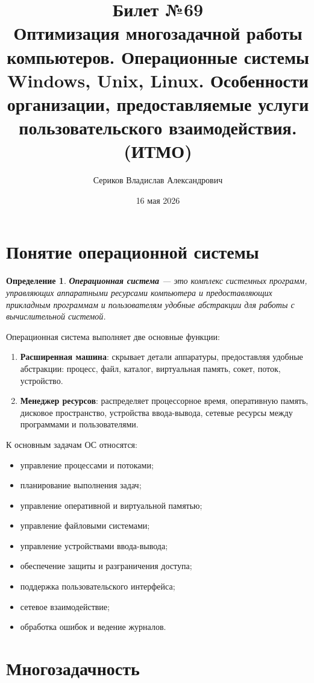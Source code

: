 \documentclass[12pt,a4paper]{article}
\title{Билет №69 \\ \small Оптимизация многозадачной работы компьютеров. Операционные системы Windows, Unix, Linux. Особенности организации, предоставляемые услуги пользовательского взаимодействия. (ИТМО)}
\author{Сериков Владислав Александрович}
\date{16 мая 2026}
\newtheorem{definition}{Определение}
\begin{document}
\maketitle
\tableofcontents
\newpage

\section{Понятие операционной системы}

\begin{definition}
\textbf{Операционная система} --- это комплекс системных программ, управляющих аппаратными ресурсами компьютера и предоставляющих прикладным программам и пользователям удобные абстракции для работы с вычислительной системой.
\end{definition}

Операционная система выполняет две основные функции:

\begin{enumerate}
    \item \textbf{Расширенная машина}: скрывает детали аппаратуры, предоставляя удобные абстракции: процесс, файл, каталог, виртуальная память, сокет, поток, устройство.
    \item \textbf{Менеджер ресурсов}: распределяет процессорное время, оперативную память, дисковое пространство, устройства ввода-вывода, сетевые ресурсы между программами и пользователями.
\end{enumerate}

К основным задачам ОС относятся:

\begin{itemize}
    \item управление процессами и потоками;
    \item планирование выполнения задач;
    \item управление оперативной и виртуальной памятью;
    \item управление файловыми системами;
    \item управление устройствами ввода-вывода;
    \item обеспечение защиты и разграничения доступа;
    \item поддержка пользовательского интерфейса;
    \item сетевое взаимодействие;
    \item обработка ошибок и ведение журналов.
\end{itemize}

\section{Многозадачность}
\end{document}
